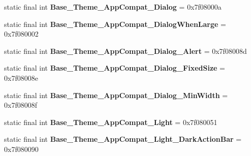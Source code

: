 \begin{DoxyCompactItemize}
\item 
\hypertarget{classandroid_1_1support_1_1v7_1_1appcompat_1_1_r_1_1style_a38182a25356e4f9666256f98e5ca7125}{}static final int {\bfseries Base\+\_\+\+Theme\+\_\+\+App\+Compat\+\_\+\+Dialog} = 0x7f08000a\label{classandroid_1_1support_1_1v7_1_1appcompat_1_1_r_1_1style_a38182a25356e4f9666256f98e5ca7125}

\item 
\hypertarget{classandroid_1_1support_1_1v7_1_1appcompat_1_1_r_1_1style_ab3c5904aaf094fea489a96fd27d27f5c}{}static final int {\bfseries Base\+\_\+\+Theme\+\_\+\+App\+Compat\+\_\+\+Dialog\+When\+Large} = 0x7f080002\label{classandroid_1_1support_1_1v7_1_1appcompat_1_1_r_1_1style_ab3c5904aaf094fea489a96fd27d27f5c}

\item 
\hypertarget{classandroid_1_1support_1_1v7_1_1appcompat_1_1_r_1_1style_ada2c22dc6fb4c92d077cd4a02d43b80f}{}static final int {\bfseries Base\+\_\+\+Theme\+\_\+\+App\+Compat\+\_\+\+Dialog\+\_\+\+Alert} = 0x7f08008d\label{classandroid_1_1support_1_1v7_1_1appcompat_1_1_r_1_1style_ada2c22dc6fb4c92d077cd4a02d43b80f}

\item 
\hypertarget{classandroid_1_1support_1_1v7_1_1appcompat_1_1_r_1_1style_a3072b639ca4d5edf5804977ebeb2d49e}{}static final int {\bfseries Base\+\_\+\+Theme\+\_\+\+App\+Compat\+\_\+\+Dialog\+\_\+\+Fixed\+Size} = 0x7f08008e\label{classandroid_1_1support_1_1v7_1_1appcompat_1_1_r_1_1style_a3072b639ca4d5edf5804977ebeb2d49e}

\item 
\hypertarget{classandroid_1_1support_1_1v7_1_1appcompat_1_1_r_1_1style_a6c7bf430cec7ead4856c4bd105b372f7}{}static final int {\bfseries Base\+\_\+\+Theme\+\_\+\+App\+Compat\+\_\+\+Dialog\+\_\+\+Min\+Width} = 0x7f08008f\label{classandroid_1_1support_1_1v7_1_1appcompat_1_1_r_1_1style_a6c7bf430cec7ead4856c4bd105b372f7}

\item 
\hypertarget{classandroid_1_1support_1_1v7_1_1appcompat_1_1_r_1_1style_a21221b90b140d668d6828375f531bd0e}{}static final int {\bfseries Base\+\_\+\+Theme\+\_\+\+App\+Compat\+\_\+\+Light} = 0x7f080051\label{classandroid_1_1support_1_1v7_1_1appcompat_1_1_r_1_1style_a21221b90b140d668d6828375f531bd0e}

\item 
\hypertarget{classandroid_1_1support_1_1v7_1_1appcompat_1_1_r_1_1style_a8a1bcb0c15999d6dc1bb8982c227409f}{}static final int {\bfseries Base\+\_\+\+Theme\+\_\+\+App\+Compat\+\_\+\+Light\+\_\+\+Dark\+Action\+Bar} = 0x7f080090\label{classandroid_1_1support_1_1v7_1_1appcompat_1_1_r_1_1style_a8a1bcb0c15999d6dc1bb8982c227409f}


\end{DoxyCompactItemize}
